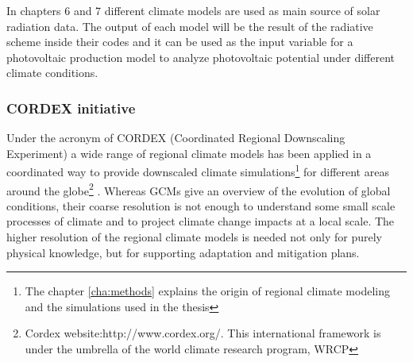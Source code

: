 



In chapters 6 and 7 different climate models are used as main source of solar radiation data. The output of each model will be the result of the radiative scheme inside their codes and it can be used as the input variable for a photovoltaic production model to analyze photovoltaic potential under different climate conditions.

\subsubsection{CORDEX initiative}

Under the acronym of CORDEX (Coordinated Regional Downscaling Experiment) a wide range of regional climate models has been applied in a coordinated way to provide downscaled climate simulations\footnote{The chapter \ref{cha:methods} explains the origin of regional climate modeling and the simulations used in the thesis} for different areas around the globe\footnote{Cordex website:http://www.cordex.org/. This international framework is under the umbrella of the world climate research program, WRCP} . Whereas GCMs give an overview of the evolution of global conditions, their coarse resolution is not enough to understand some small scale processes of climate and to project climate change impacts at a local scale. The higher resolution of the regional climate models is needed not only for purely physical knowledge, but for supporting adaptation and mitigation plans.
 
